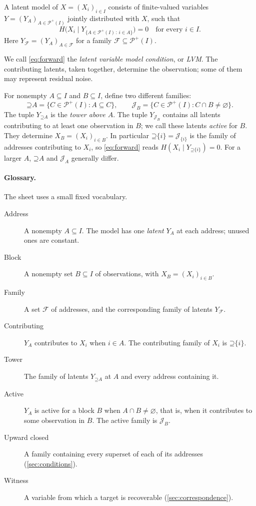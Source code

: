 \documentclass[11pt]{article}
\newcommand{\PI}{\mathcal{P}^{+}(I)}
\newcommand{\Up}{\mathord{\supseteq}}
\begin{document}
\begin{definition}
\label{def:model}
A latent model of $X=(X_i)_{i\in I}$ consists of finite-valued variables
$Y=(Y_A)_{A\in\PI}$ jointly distributed with $X$, such that
\begin{equation}
 H\bigl(X_i\mid Y_{\{A\in\PI\,:\,i\in A\}}\bigr)=0
 \quad\text{for every }i\in I.
 \label{eq:forward}
\end{equation}
Here $Y_{\mathcal{F}}=(Y_A)_{A\in\mathcal{F}}$ for a family
$\mathcal{F}\subseteq\PI$.
\end{definition}

We call \eqref{eq:forward} the \emph{latent variable model condition}, or
\emph{LVM}. The contributing latents, taken together, determine the
observation; some of them may represent residual noise.

For nonempty $A\subseteq I$ and $B\subseteq I$, define two different families:
\[
 \Up A=\{C\in\PI:A\subseteq C\},\qquad
 \mathcal{J}_B=\{C\in\PI:C\cap B\ne\varnothing\}.
\]
The tuple $Y_{\Up A}$ is the \emph{tower above $A$}. The tuple
$Y_{\mathcal{J}_B}$ contains all latents contributing to at least one observation
in $B$; we call these latents \emph{active} for $B$. They determine
$X_B=(X_i)_{i\in B}$.
In particular $\Up\{i\}=\mathcal{J}_{\{i\}}$ is the family of addresses
contributing to $X_i$, so \eqref{eq:forward} reads $H(X_i\mid Y_{\Up\{i\}})=0$.
For a larger $A$, $\Up A$ and $\mathcal{J}_A$ generally differ.

\paragraph{Glossary.} The sheet uses a small fixed vocabulary.
\begin{description}
\item[Address] A nonempty $A\subseteq I$. The model has one \emph{latent}
$Y_A$ at each address; unused ones are constant.
\item[Block] A nonempty set $B\subseteq I$ of observations, with
$X_B=(X_i)_{i\in B}$.
\item[Family] A set $\mathcal{F}$ of addresses, and the corresponding
family of latents $Y_{\mathcal{F}}$.
\item[Contributing] $Y_A$ contributes to $X_i$ when $i\in A$. The
contributing family of $X_i$ is $\Up\{i\}$.
\item[Tower] The family of latents $Y_{\Up A}$ at $A$ and every address
containing it.
\item[Active] $Y_A$ is active for a block $B$ when $A\cap B\ne\varnothing$,
that is, when it contributes to some observation in $B$. The active family is
$\mathcal{J}_B$.
\item[Upward closed] A family containing every superset of each of its
addresses (\cref{sec:conditions}).
\item[Witness] A variable from which a target is recoverable
(\cref{sec:correspondence}).
\end{description}
\end{document}
